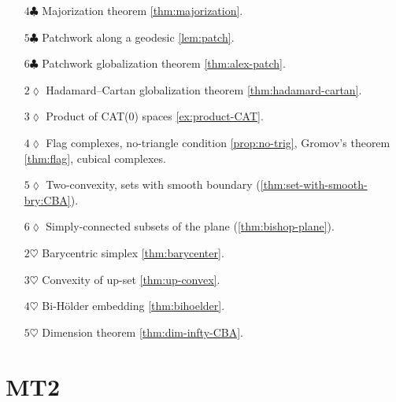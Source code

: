 \begin{itemize}
\vskip1.1mm
\item[$4\clubsuit$] Majorization theorem \ref{thm:majorization}.
\vskip1.1mm
\item[$5\clubsuit$] Patchwork along a geodesic \ref{lem:patch}.
\vskip1.1mm
\item[$6\clubsuit$] Patchwork globalization theorem \ref{thm:alex-patch}.
\vskip1.1mm
\item[$2\lozenge$] Hadamard--Cartan globalization theorem \ref{thm:hadamard-cartan}.
\vskip1.1mm
\item[$3\lozenge$] Product of CAT(0) spaces \ref{ex:product-CAT}.
\vskip1.1mm
\item[$4\lozenge$] Flag complexes, no-triangle condition \ref{prop:no-trig}, Gromov's theorem \ref{thm:flag}, cubical complexes.
\vskip1.1mm
\item[$5\lozenge$] Two-convexity, sets with smooth boundary (\ref{thm:set-with-smooth-bry:CBA}).
\vskip1.1mm
\item[$6\lozenge$] Simply-connected subsets of the plane (\ref{thm:bishop-plane}).
\vskip1.1mm
\item[$2\heartsuit$] Barycentric simplex \ref{thm:barycenter}.
\vskip1.1mm
\item[$3\heartsuit$] Convexity of up-set \ref{thm:up-convex}.
\vskip1.1mm
\item[$4\heartsuit$] Bi-H\"older embedding \ref{thm:bihoelder}.
\vskip1.1mm
\item[$5\heartsuit$] Dimension theorem \ref{thm:dim-infty-CBA}.
\end{itemize}

\chapter*{MT2}

